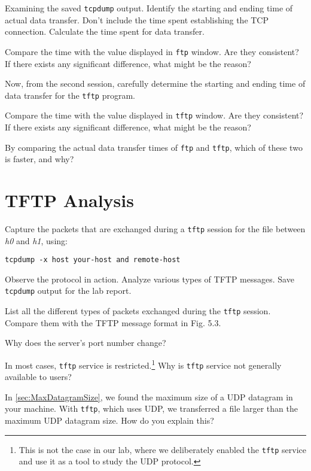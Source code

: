 \documentclass{../UTNetLab}
\begin{document}
    \begin{report}
    \item Examining the saved \lstinline{tcpdump} output. Identify the starting and ending time of actual data transfer.
    Don’t include the time spent establishing the TCP connection.
    Calculate the time spent for data transfer. 

    \item Compare the time with the value displayed in \lstinline{ftp} window.
    Are they consistent?
    If there exists any significant difference, what might be the reason? 

    \item Now, from the second session, carefully determine the starting and ending time of data transfer for the \lstinline{tftp} program. 

    \item Compare the time with the value displayed in \lstinline{tftp} window.
    Are they consistent?
    If there exists any significant difference, what might be the reason? 

    \item By comparing the actual data transfer times of \lstinline{ftp} and \lstinline{tftp}, which of these two is faster, and why?
    \end{report}

\section{TFTP Analysis}
    Capture the packets that are exchanged during a \lstinline{tftp} session for the  file between \textit{h0} and \textit{h1}, using:
    \begin{lstlisting}[emph={your-host, remote-host}]
tcpdump -x host your-host and remote-host
    \end{lstlisting}
    Observe the protocol in action.    Analyze various types of TFTP messages. Save \lstinline{tcpdump} output for the lab report.
    
    \begin{report}
        \item List all the different types of packets exchanged during the \lstinline{tftp} session. Compare them with the TFTP message format in Fig. 5.3.

        Why does the server’s port number change?
        
        \item In most cases, \lstinline{tftp} service is restricted.\footnote{This is not the case in our lab, where we deliberately enabled the \lstinline{tftp} service and use it as a tool to study the UDP protocol.}
        Why is \lstinline{tftp} service not generally available to users?
        
        \item In \autoref{sec:MaxDatagramSize}, we found the maximum size of a UDP datagram in your machine. With \lstinline{tftp}, which uses UDP, we transferred a file larger than the maximum UDP datagram size.
        How do you explain this?
    \end{report}
\end{document}
